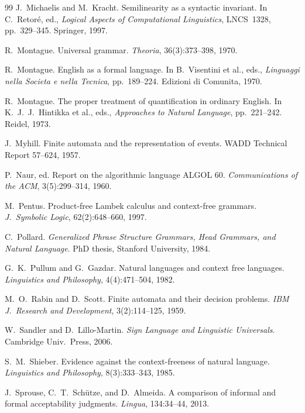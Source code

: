 \documentclass[12pt,a4paper]{article}
\begin{document}
\begin{thebibliography}{99}
J.~Michaelis and M.~Kracht.
\newblock Semilinearity as a syntactic invariant.
\newblock In C.~Retor\'{e}, ed., \emph{Logical Aspects of Computational Linguistics}, LNCS~1328, pp.~329--345. Springer, 1997.

R.~Montague.
\newblock Universal grammar.
\newblock \emph{Theoria}, 36(3):373--398, 1970.

R.~Montague.
\newblock English as a formal language.
\newblock In B.~Visentini et al., eds., \emph{Linguaggi nella Societa e nella Tecnica}, pp.~189--224. Edizioni di Comunita, 1970.

R.~Montague.
\newblock The proper treatment of quantification in ordinary English.
\newblock In K.~J.~J.~Hintikka et al., eds., \emph{Approaches to Natural Language}, pp.~221--242. Reidel, 1973.

J.~Myhill.
\newblock Finite automata and the representation of events.
\newblock WADD Technical Report 57--624, 1957.

P.~Naur, ed.
\newblock Report on the algorithmic language ALGOL 60.
\newblock \emph{Communications of the ACM}, 3(5):299--314, 1960.

M.~Pentus.
\newblock Product-free Lambek calculus and context-free grammars.
\newblock \emph{J.\ Symbolic Logic}, 62(2):648--660, 1997.

C.~Pollard.
\newblock \emph{Generalized Phrase Structure Grammars, Head Grammars, and Natural Language}.
\newblock PhD thesis, Stanford University, 1984.

G.~K.~Pullum and G.~Gazdar.
\newblock Natural languages and context free languages.
\newblock \emph{Linguistics and Philosophy}, 4(4):471--504, 1982.

M.~O.~Rabin and D.~Scott.
\newblock Finite automata and their decision problems.
\newblock \emph{IBM J.\ Research and Development}, 3(2):114--125, 1959.

W.~Sandler and D.~Lillo-Martin.
\newblock \emph{Sign Language and Linguistic Universals}.
\newblock Cambridge Univ.\ Press, 2006.

S.~M.~Shieber.
\newblock Evidence against the context-freeness of natural language.
\newblock \emph{Linguistics and Philosophy}, 8(3):333--343, 1985.

J.~Sprouse, C.~T.~Sch\"{u}tze, and D.~Almeida.
\newblock A comparison of informal and formal acceptability judgments.
\newblock \emph{Lingua}, 134:34--44, 2013.


\end{thebibliography}
\end{document}
